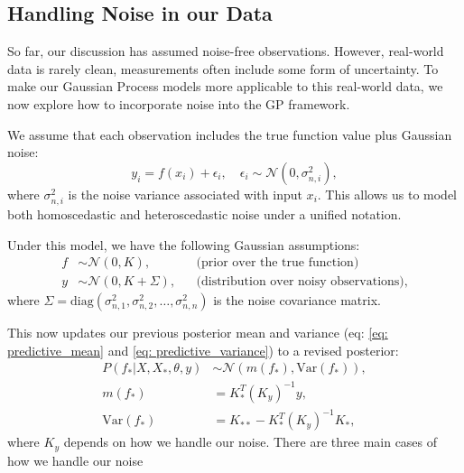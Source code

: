 \documentclass[12pt]{article}
\begin{document}
\subsection{Handling Noise in our Data}
\label{sec: Handlingnoise}

So far, our discussion has assumed noise-free observations. However, real-world data is rarely clean, measurements often include some form of uncertainty. To make our Gaussian Process models more applicable to this real-world data,
we now explore how to incorporate noise into the GP framework.

\bigskip

\noindent
We assume that each observation includes the true function value plus Gaussian noise:
\begin{equation}
y_i = f(x_i) + \epsilon_i, \quad \epsilon_i \sim \mathcal{N}(0, \sigma_{n,i}^2),
\end{equation}
where \( \sigma_{n,i}^2 \) is the noise variance associated with input \( x_i \). This allows us to model both homoscedastic and heteroscedastic noise under a unified notation.

\bigskip

\noindent
Under this model, we have the following Gaussian assumptions:
\begin{align}
f &\sim \mathcal{N}(0, K), &&\text{(prior over the true function)} \\
y &\sim \mathcal{N}(0, K + \Sigma), &&\text{(distribution over noisy observations)},
\label{eq: prior_distribution_noise}
\end{align}
where \( \Sigma = \mathrm{diag}(\sigma_{n,1}^2, \sigma_{n,2}^2, \dots, \sigma_{n,n}^2) \) is the noise covariance matrix.

\bigskip
\noindent
This now updates our previous posterior mean and variance (eq: \ref{eq: predictive_mean} and \ref{eq: predictive_variance}) to a revised posterior:
%
%
\begin{subequations}
\begin{align}
    P(f_*|X,X_*,\theta,y) &\sim \mathcal{N}(m(f_*), \text{Var}(f_*))
    \label{eq: predictive_distribution_noise},\\
m(f_*) &= K_*^T (K_y)^{-1} y,
\label{eq: predictive_mean_noise}\\
\text{Var}(f_*) &= K_{**} - K_*^T (K_y)^{-1} K_*,
\label{eq: predictive_variance_noise}
\end{align}
\end{subequations}
%
%
where \(K_y\) depends on how we handle our noise. There are three main cases of how we handle our noise
\end{document}
